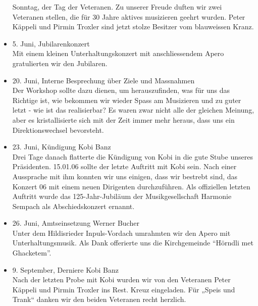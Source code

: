 \begin{history}
\begin{itemize}
              Sonntag, der Tag der Veteranen. Zu unserer Freude duften wir zwei
              Veteranen stellen, die für 30 Jahre aktives musizieren geehrt wurden.
              Peter Käppeli und Pirmin Troxler sind jetzt stolze Besitzer vom
              blauweissen Kranz.

        \item 5. Juni, Jubilarenkonzert\\
              Mit einem kleinen Unterhaltungskonzert mit anschliessendem Apero
              gratulierten wir den Jubilaren.

        \item 20. Juni, Interne Besprechung über Ziele und Massnahmen\\
              Der Workshop sollte dazu dienen, um herauszufinden, was für uns das
              Richtige ist, wie bekommen wir wieder Spass am Musizieren und zu guter
              letzt - wie ist das realisierbar? Es waren zwar nicht alle der gleichen
              Meinung, aber es kristallisierte sich mit der Zeit immer mehr heraus,
              dass uns ein Direktionswechsel bevorsteht.

        \item 23. Juni, Kündigung Kobi Banz\\
              Drei Tage danach flatterte die Kündigung von Kobi in die gute Stube
              unseres Präsidenten. 15.01.06 sollte der letzte Auftritt mit Kobi sein.
              Nach einer Aussprache mit ihm konnten wir uns einigen, dass wir bestrebt
              sind, das Konzert 06 mit einem neuen Dirigenten durchzuführen. Als
              offiziellen letzten Auftritt wurde das 125-Jahr-Jubiläum der
              Musikgesellschaft Harmonie Sempach als Abschiedskonzert ernannt.

        \item 26. Juni, Amtseinsetzung Werner Bucher\\
              Unter dem Hildisrieder Inpuls-Vordach umrahmten wir den Apero mit
              Unterhaltungsmusik. Als Dank offerierte uns die Kirchgemeinde \enquote{Hörndli
                  met Ghacketem}.

        \item 9. September, Derniere Kobi Banz\\
              Nach der letzten Probe mit Kobi wurden wir von den Veteranen Peter
              Käppeli und Pirmin Troxler ins Rest. Kreuz eingeladen. Für „Speis und Trank“
              danken wir den beiden Veteranen recht herzlich.


\end{itemize}
\end{history}
